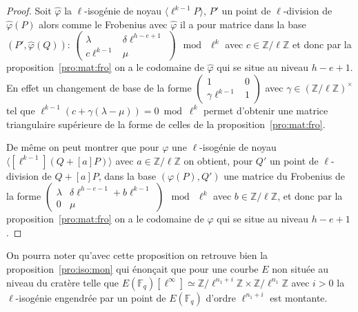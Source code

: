 \documentclass[10pt,a4paper]{book}
\theoremstyle{plain}
\theoremstyle{definition}
\theoremstyle{definition}
\theoremstyle{definition}
\theoremstyle{definition}
\theoremstyle{remark}
\theoremstyle{remark}
\theoremstyle{definition}
\begin{document}
\begin{proof}
Soit $\widehat{\varphi}$ la $\ell$-isogénie de noyau $\langle \ell^{k-1}P 
\rangle$, $P'$ un point de $\ell$-division de $\widehat{\varphi}(P)$ alors 
comme le Frobenius avec $\widehat{\varphi}$ il a pour matrice dans la base 
$( P',\widehat{\varphi}(Q) )$: $\left( \begin{smallmatrix} \lambda 
& \delta \ell^{h-e+1} \\ c \ell^{k-1} & \mu \end{smallmatrix} \right)~\bmod~\ell^k$ 
avec $c \in \mathbb{Z}/\ell \mathbb{Z}$ et donc par la 
proposition~\ref{pro:mat:fro} on a le codomaine de $\widehat{\varphi}$ qui se 
situe au niveau $h-e+1$. En effet un changement de base de la forme $\left( 
\begin{smallmatrix} 1 & 0 \\ \gamma \ell^{k-1} & 1 \end{smallmatrix} \right)$ 
avec $\gamma \in (\mathbb{Z}/\ell \mathbb{Z})^{\times}$ tel que $\ell^{k-1}(c+
\gamma (\lambda -\mu))=0 \bmod \ell^k$ permet d'obtenir une matrice 
triangulaire supérieure de la forme de celles de la 
proposition~\ref{pro:mat:fro}.

De même on peut montrer que pour $\varphi$ une $\ell$-isogénie de noyau 
$\langle [\ell^{k-1}](Q+[a]P) \rangle$ avec $a \in \mathbb{Z}/\ell \mathbb{Z}$ 
on obtient, pour $Q'$ un point de $\ell$-division de $Q+[a]P$, dans la base 
$(\varphi(P), Q')$ une matrice du Frobenius de la forme $\left( 
\begin{smallmatrix} \lambda & \delta \ell^{h-e-1}+b\ell^{k-1} \\ 0 & \mu 
\end{smallmatrix} \right)~\bmod~\ell^k$ avec $b \in \mathbb{Z}/\ell 
\mathbb{Z}$,  et donc par la proposition~\ref{pro:mat:fro} on a le codomaine de 
$\varphi$ qui se situe au niveau $h-e+1$.
\end{proof}


On pourra noter qu'avec cette proposition on retrouve bien la 
proposition~\ref{pro:iso:mon} qui énonçait que pour une courbe $E$ non située
au niveau du cratère telle que $E(\mathbb{F}_q)[\ell^{\infty}]\simeq 
\mathbb{Z}/\ell^{n_1+i} \mathbb{Z} \times \mathbb{Z}/\ell^{n_1} \mathbb{Z}$ 
avec $i>0$ la $\ell$-isogénie engendrée par un point de $E(\mathbb{F}_q)$ 
d'ordre $\ell^{n_1+i}$ est montante.
\end{document}
